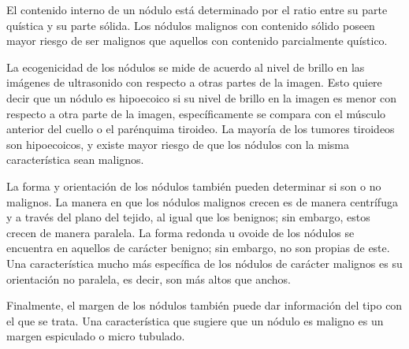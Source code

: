 El contenido interno de un nódulo está determinado por el ratio entre su parte quística y su parte sólida. Los nódulos malignos con contenido sólido poseen mayor riesgo de ser malignos que aquellos con contenido parcialmente quístico.

La ecogenicidad de los nódulos se mide de acuerdo al nivel de brillo en las imágenes de ultrasonido con respecto a otras partes de la imagen. Esto quiere decir que un nódulo es hipoecoico si su nivel de brillo en la imagen es menor con respecto a otra parte de la imagen, específicamente se compara con el músculo anterior del cuello o el parénquima tiroideo. La mayoría de los tumores tiroideos son hipoecoicos, y existe mayor riesgo de que los nódulos con la misma característica sean malignos.

La forma y orientación de los nódulos también pueden determinar si son o no malignos. La manera en que los nódulos malignos crecen es de manera centrífuga y a través del plano del tejido, al igual que los benignos; sin embargo, estos crecen de manera paralela. La forma redonda u ovoide de los nódulos se encuentra en aquellos de carácter benigno; sin embargo, no son propias de este. Una característica mucho más específica de los nódulos de carácter malignos es su orientación no paralela, es decir, son más altos que anchos.

Finalmente, el margen de los nódulos también puede dar información del tipo con el que se trata. Una característica que sugiere que un nódulo es maligno es un margen espiculado o micro tubulado.

